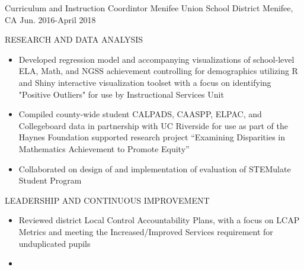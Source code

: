 \begin{cventries}
  \cventry
    {Curriculum and Instruction Coordintor} %
    {Menifee Union School District} %
    {Menifee, CA} %
    {Jun. 2016-April 2018} %
    {
      \begin{cvitems} %
          \item RESEARCH AND DATA ANALYSIS
          \begin{itemize}
            \item {Developed regression model and accompanying visualizations of school-level ELA, Math, and NGSS achievement controlling for demographics utilizing R and Shiny interactive visualization toolset with a focus on identifying "Positive Outliers" for use by Instructional Services Unit}
            \item {Compiled county-wide student CALPADS, CAASPP, ELPAC, and Collegeboard data in partnership with UC Riverside for use as part of the Haynes Foundation supported research project “Examining Disparities in Mathematics Achievement to Promote Equity”}
            \item {Collaborated on design of and implementation of evaluation of STEMulate Student Program}
          \end{itemize}
          \item LEADERSHIP AND CONTINUOUS IMPROVEMENT
          \begin{itemize}
            \item {Reviewed district Local Control Accountability Plans, with a focus on LCAP Metrics and meeting the Increased/Improved Services requirement for unduplicated pupils}
            \item {}
          \end{itemize}
      \end{cvitems}
    }



\end{cventries}
